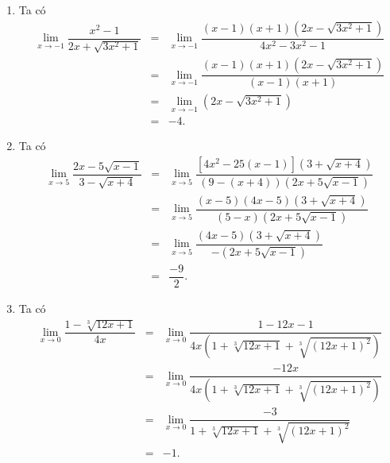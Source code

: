 \begin{ex}
{\begin{enumerate}
\begin{eqnarray*}
				 &=&\dfrac{-4}{15}.
			\end{eqnarray*}
			\item Ta  có
			\begin{eqnarray*}
				\displaystyle\lim_{x \to -1} \dfrac{x^2-1}{2x+\sqrt{3x^2+ 1}} 
				 &=& \displaystyle\lim_{x \to -1} \dfrac{(x-1)(x+1)\left(2x- \sqrt{3x^2+1}\right)}{4x^2-3x^2-1} \\
				&=& \displaystyle\lim_{x \to -1}  \dfrac{(x-1)(x+1)\left(2x- \sqrt{3x^2+1}\right)}{(x-1)(x+1)} \\
				&=& \displaystyle\lim_{x \to -1}  \left(2x-\sqrt{3x^2+1}\right)\\
				 &=& -4.
			\end{eqnarray*}
			\item  Ta có
			\begin{eqnarray*}
				\displaystyle\lim_{x \to  5} \dfrac{2x-5\sqrt{x-1}}{3-\sqrt{x+4}}
				&=& \displaystyle\lim_{x\to 5} \dfrac{\left[4x^2-25(x-1)\right]\left(3+\sqrt{x+4}\right)}{\left(9-(x+4)\right)\left(2x+5\sqrt{x-1}\right)} \\ 
				&=& \displaystyle\lim_{x\to 5} \dfrac{(x-5)(4x-5)\left(3+\sqrt{x+4}\right)}{(5-x)\left(2x+5\sqrt{x-1}\right)} \\ 
				&=& \displaystyle\lim_{x\to 5} \dfrac{(4x-5)\left(3+\sqrt{x+4}\right)}{-\left(2x+5\sqrt{x-1}\right)}  \\
				&=&\dfrac{-9}{2}. 
			\end{eqnarray*}
			 \item Ta có
			\begin{eqnarray*}
				\displaystyle\lim_{x  \to 0} \dfrac{1-\sqrt[3]{12x+1}}{4x}
				&=&  \displaystyle\lim_{x \to 0} \dfrac{1-12x-1}{4x\left(1+\sqrt[3]{12x+1}+\sqrt[3]{(12x+1)^2}\right)} \\
				&=& \displaystyle\lim_{x \to 0} \dfrac{-12x}{4x\left(1+\sqrt[3]{12x +  1}+\sqrt[3]{(12x + 1)^2}\right)} \\
				&=& \displaystyle\lim_{x  \to 0} \dfrac{-3}{1+\sqrt[3]{12x + 1}+\sqrt[3]{(12x+1)^2}} \\
				 &=& -1.
			\end{eqnarray*}
		\end{enumerate}
	} 
\end{ex}

